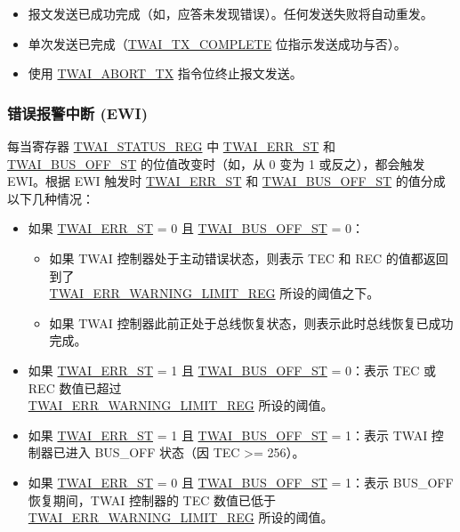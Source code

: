 \documentclass[main\_\_CN.tex]{subfiles}
\begin{document}
\begin{itemize}
    \item 报文发送已成功完成（如，应答未发现错误）。任何发送失败将自动重发。
    \item 单次发送已完成（\hyperref[fielddesc:TWAITXCOMPLETE]{TWAI\_TX\_COMPLETE} 位指示发送成功与否）。
    \item 使用 \hyperref[fielddesc:TWAIABORTTX]{TWAI\_ABORT\_TX} 指令位终止报文发送。
\end{itemize}

\subsubsection{错误报警中断 (EWI)}
每当寄存器 \hyperref[regdesc:TWAISTATUSREG]{TWAI\_STATUS\_REG} 中 \hyperref[fielddesc:TWAIERRST]{TWAI\_ERR\_ST} 和 \hyperref[fielddesc:TWAIBUSOFFST]{TWAI\_BUS\_OFF\_ST} 的位值改变时（如，从 0 变为 1 或反之），都会触发 EWI。根据 EWI 触发时 \hyperref[fielddesc:TWAIERRST]{TWAI\_ERR\_ST} 和 \hyperref[fielddesc:TWAIBUSOFFST]{TWAI\_BUS\_OFF\_ST} 的值分成以下几种情况：

\begin{itemize}
    \item 如果 \hyperref[fielddesc:TWAIERRST]{TWAI\_ERR\_ST} = 0 且 \hyperref[fielddesc:TWAIBUSOFFST]{TWAI\_BUS\_OFF\_ST} = 0：
    \begin{itemize}
        \item 如果 TWAI 控制器处于主动错误状态，则表示 TEC 和 REC 的值都返回到了 \\\hyperref[regdesc:TWAIERRWARNINGLIMITREG]{TWAI\_ERR\_WARNING\_LIMIT\_REG} 所设的阈值之下。
        \item 如果 TWAI 控制器此前正处于总线恢复状态，则表示此时总线恢复已成功完成。
    \end{itemize}
    \item 如果 \hyperref[fielddesc:TWAIERRST]{TWAI\_ERR\_ST} = 1 且 \hyperref[fielddesc:TWAIBUSOFFST]{TWAI\_BUS\_OFF\_ST} = 0：表示 TEC 或 REC 数值已超过 \\\hyperref[regdesc:TWAIERRWARNINGLIMITREG]{TWAI\_ERR\_WARNING\_LIMIT\_REG} 所设的阈值。
    \item 如果 \hyperref[fielddesc:TWAIERRST]{TWAI\_ERR\_ST} = 1 且 \hyperref[fielddesc:TWAIBUSOFFST]{TWAI\_BUS\_OFF\_ST} = 1：表示 TWAI 控制器已进入 BUS\_OFF 状态（因 TEC >= 256）。
    \item 如果 \hyperref[fielddesc:TWAIERRST]{TWAI\_ERR\_ST} = 0 且 \hyperref[fielddesc:TWAIBUSOFFST]{TWAI\_BUS\_OFF\_ST} = 1：表示 BUS\_OFF 恢复期间，TWAI 控制器的 TEC 数值已低于 \hyperref[regdesc:TWAIERRWARNINGLIMITREG]{TWAI\_ERR\_WARNING\_LIMIT\_REG} 所设的阈值。
\end{itemize}
\end{document}

